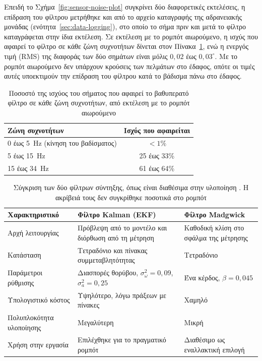 \documentclass[11pt]{report}
\begin{document}
Επειδή το Σχήμα~\ref{fig:sensor-noise-plot} συγκρίνει δύο διαφορετικές
εκτελέσεις, η επίδραση του φίλτρου μετρήθηκε και από το αρχείο καταγραφής της
αδρανειακής μονάδας (ενότητα~\ref{sec:data-logging}), στο οποίο το σήμα πριν και
μετά το φίλτρο καταγράφεται στην ίδια εκτέλεση. Σε εκτέλεση με το ρομπότ
αιωρούμενο, η ισχύς που αφαιρεί το φίλτρο σε κάθε ζώνη συχνοτήτων δίνεται στον
Πίνακα~\ref{tab:lpf-bands}, ενώ η ενεργός τιμή (RMS) της διαφοράς των δύο
σημάτων είναι μόλις $0{,}02$ έως $0{,}03^\circ$. Με το ρομπότ αιωρούμενο δεν
υπάρχουν κρούσεις των πελμάτων στο έδαφος, οπότε οι τιμές αυτές υποεκτιμούν την
επίδραση του φίλτρου κατά το βάδισμα πάνω στο έδαφος.

\begin{table}[htbp]
    \centering
    \small
    \begin{tabular}{@{}l c@{}}
        \toprule
        Ζώνη συχνοτήτων & Ισχύς που αφαιρείται \\
        \midrule
        0 έως 5~Hz (κίνηση του βαδίσματος) & $< 1\%$ \\
        5 έως 15~Hz & 25 έως 33\% \\
        15 έως 34~Hz & 61 έως 64\% \\
        \bottomrule
    \end{tabular}
    \caption[Επίδραση του βαθυπερατού φίλτρου ανά ζώνη συχνοτήτων]{Ποσοστό της
    ισχύος του σήματος που αφαιρεί το βαθυπερατό φίλτρο σε κάθε ζώνη
    συχνοτήτων, από εκτέλεση με το ρομπότ αιωρούμενο}
    \label{tab:lpf-bands}
\end{table}

\begin{table}[htbp]
    \centering
    \small
    \begin{tabular}{@{}p{3.6cm} p{5.0cm} p{4.6cm}@{}}
        \toprule
        Χαρακτηριστικό & Φίλτρο Kalman (EKF) & Φίλτρο Madgwick \\
        \midrule
        Αρχή λειτουργίας & Πρόβλεψη από το μοντέλο και διόρθωση από τη μέτρηση & Καθοδική κλίση στο σφάλμα της μέτρησης \\
        Κατάσταση & Τετραδόνιο και πίνακας συμμεταβλητότητας & Τετραδόνιο \\
        Παράμετροι ρύθμισης & Διασπορές θορύβου, $\sigma_\omega^2 = 0{,}09$, $\sigma_a^2 = 0{,}25$ & Ένα κέρδος, $\beta = 0{,}045$ \\
        Υπολογιστικό κόστος & Υψηλότερο, λόγω πράξεων με πίνακες & Χαμηλό \\
        Πολυπλοκότητα υλοποίησης & Μεγαλύτερη & Μικρή \\
        Χρήση στην εργασία & Επιλέχθηκε για το πραγματικό ρομπότ & Διαθέσιμο ως εναλλακτική επιλογή \\
        \bottomrule
    \end{tabular}
    \caption[Σύγκριση των φίλτρων Kalman και Madgwick]{Σύγκριση των δύο
    φίλτρων σύντηξης, όπως είναι διαθέσιμα στην υλοποίηση
    \cite{garcia_ahrs}. Η ακρίβειά τους δεν συγκρίθηκε ποσοτικά στο ρομπότ}
    \label{tab:filter-comparison}
\end{table}
\end{document}
